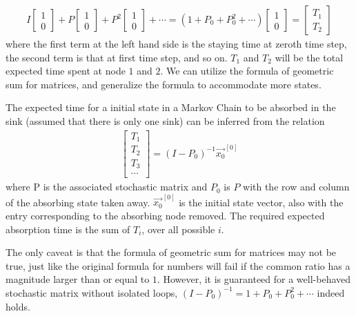 \begin{align*}
I
\begin{bmatrix}
1 \\
0
\end{bmatrix}
+
P
\begin{bmatrix}
1 \\
0
\end{bmatrix}
+
P^2
\begin{bmatrix}
1 \\
0
\end{bmatrix}
+ \cdots 
=
(1 + P_0 + P_0^2 + \cdots)
\begin{bmatrix}
1 \\
0
\end{bmatrix}
=
\begin{bmatrix}
T_1 \\
T_2
\end{bmatrix}
\end{align*}
where the first term at the left hand side is the staying time at zeroth time step, the second term is that at first time step, and so on. $T_1$ and $T_2$ will be the total expected time spent at node $1$ and $2$. We can utilize the formula of geometric sum for matrices, and generalize the formula to accommodate more states.
\begin{proper}
The expected time for a initial state in a Markov Chain to be absorbed in the sink (assumed that there is only one sink) can be inferred from the relation
\begin{align*}
\begin{bmatrix}
T_1 \\
T_2 \\
T_3 \\
\cdots
\end{bmatrix}
=
(I - P_0)^{-1}
\vec{x_0}^{[0]}
\end{align*}
where P is the associated stochastic matrix and $P_0$ is $P$ with the row and column of the absorbing state taken away. $\vec{x_0}^{[0]}$ is the initial state vector, also with the entry corresponding to the absorbing node removed. The required expected absorption time is the sum of $T_i$, over all possible $i$. 
\end{proper}
The only caveat is that the formula of geometric sum for matrices may not be true, just like the original formula for numbers will fail if the common ratio has a magnitude larger than or equal to $1$. However, it is guaranteed for a well-behaved stochastic matrix without isolated loops, $(I - P_0)^{-1} = 1 + P_0 + P_0^2 + \cdots$ indeed holds.
